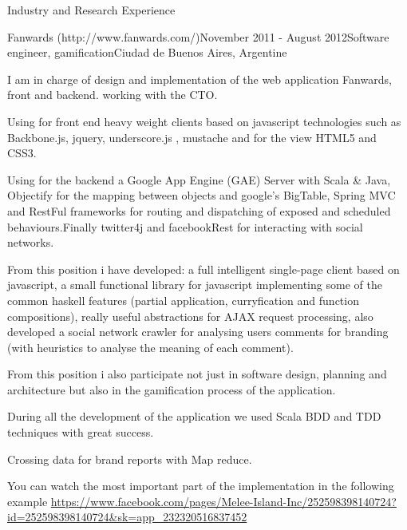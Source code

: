 \documentclass{resume} %
\begin{document}
\begin{rSection}{Industry and Research Experience}
\begin{rSubsection}{Fanwards (http://www.fanwards.com/)}{November 2011 - August 2012}{Software engineer, gamification}{Ciudad de Buenos Aires, Argentine}
\item I am in charge of design and implementation of the web application Fanwards, front and backend. working with the CTO.
\item Using for front end heavy weight clients based on javascript technologies such as Backbone.js, jquery, underscore.js , mustache and for the view HTML5 and CSS3.
\item Using for the backend a Google App Engine (GAE) Server with Scala \& Java, Objectify for the mapping between objects and google's BigTable, Spring MVC and RestFul frameworks for routing and dispatching of exposed and scheduled behaviours.Finally twitter4j and facebookRest for interacting with social networks.  
\item From this position i have developed: a full intelligent single-page client based on javascript,  a small functional library for javascript implementing some of the common haskell features (partial application, curryfication and function compositions), really useful abstractions for AJAX request processing, also developed a social network crawler for analysing users comments for branding (with heuristics to analyse the meaning of each comment). 
\item From this position i also participate not just in software design, planning and architecture but also in the gamification process of the application.
\item During all the development of the application we used Scala BDD and TDD techniques with great success.
\item Crossing data for brand reports with Map reduce. 
\item You can watch the most important part of the implementation in the following example \url{https://www.facebook.com/pages/Melee-Island-Inc/252598398140724?id=252598398140724&sk=app_232320516837452}
\end{rSubsection}




\end{rSection}
\end{document}
